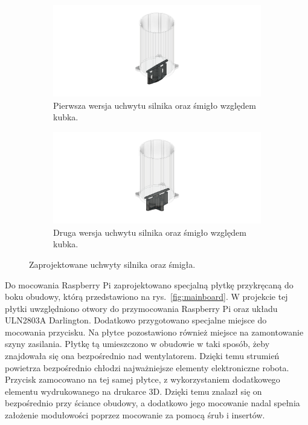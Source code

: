 \begin{figure}[H]
    \centering
    \begin{subfigure}{0.48\textwidth}
        \centering
        \includegraphics[width=\linewidth]{chapters/03-praca-wlasna/figures/uchwyt_v1}
        \caption{\label{fig:uchwyt_v1}Pierwsza wersja uchwytu silnika oraz śmigło względem kubka.}
    \end{subfigure}
    \hfill
    \begin{subfigure}{0.48\textwidth}
        \centering
        \includegraphics[width=\linewidth]{chapters/03-praca-wlasna/figures/uchwyt_v2}
        \caption{\label{fig:uchwyt_v2}Druga wersja uchwytu silnika oraz śmigło względem kubka.}
    \end{subfigure}
    \caption{\label{fig:uchwyty}Zaprojektowane uchwyty silnika oraz śmigła.}
\end{figure}


Do mocowania Raspberry Pi zaprojektowano specjalną płytkę przykręcaną do boku obudowy, którą przedstawiono na rys.~\ref{fig:mainboard}. W projekcie tej płytki uwzględniono otwory do przymocowania Raspberry
Pi oraz układu ULN2803A Darlington. Dodatkowo przygotowano specjalne miejsce do mocowania przycisku. Na płytce pozostawiono również miejsce
na zamontowanie szyny zasilania. Płytkę tą umieszczono w obudowie w taki sposób, żeby znajdowała się ona bezpośrednio nad wentylatorem. Dzięki temu
strumień powietrza bezpośrednio chłodzi najważniejsze elementy elektroniczne robota. Przycisk zamocowano na tej samej płytce, z wykorzystaniem
dodatkowego elementu wydrukowanego na drukarce 3D. Dzięki temu znalazł się on bezpośrednio przy ściance obudowy, a dodatkowo jego mocowanie
nadal spełnia założenie modułowości poprzez mocowanie za pomocą śrub i insertów.

